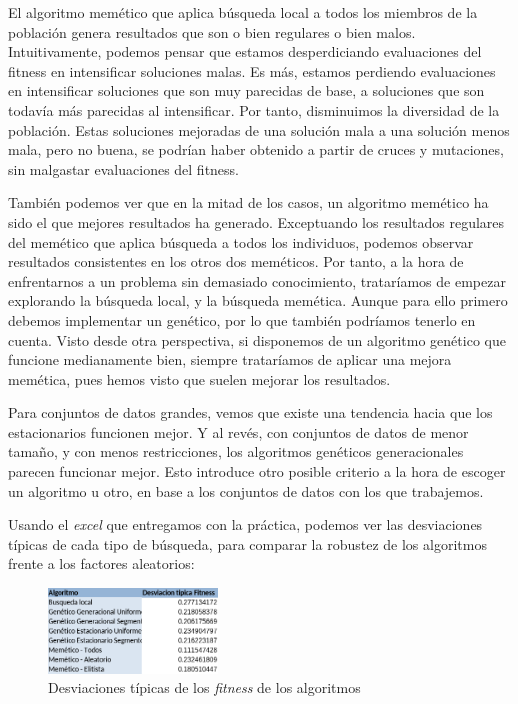 \documentclass[11pt]{article}
\begin{document}
El algoritmo memético que aplica búsqueda local a todos los miembros de la población genera resultados que son o bien regulares o bien malos. Intuitivamente, podemos pensar que estamos desperdiciando evaluaciones del fitness en intensificar soluciones malas. Es más, estamos perdiendo evaluaciones en intensificar soluciones que son muy parecidas de base, a soluciones que son todavía más parecidas al intensificar. Por tanto, disminuimos la diversidad de la población. Estas soluciones mejoradas de una solución mala a una solución menos mala, pero no buena, se podrían haber obtenido a partir de cruces y mutaciones, sin malgastar evaluaciones del fitness.

También podemos ver que en la mitad de los casos, un algoritmo memético ha sido el que mejores resultados ha generado. Exceptuando los resultados regulares del memético que aplica búsqueda a todos los individuos, podemos observar resultados consistentes en los otros dos meméticos. Por tanto, a la hora de enfrentarnos a un problema sin demasiado conocimiento, trataríamos de empezar explorando la búsqueda local, y la búsqueda memética. Aunque para ello primero debemos implementar un genético, por lo que también podríamos tenerlo en cuenta. Visto desde otra perspectiva, si disponemos de un algoritmo genético que funcione medianamente bien, siempre trataríamos de aplicar una mejora memética, pues hemos visto que suelen mejorar los resultados.

Para conjuntos de datos grandes, vemos que existe una tendencia hacia que los estacionarios funcionen mejor. Y al revés, con conjuntos de datos de menor tamaño, y con menos restricciones, los algoritmos genéticos generacionales parecen funcionar mejor. Esto introduce otro posible criterio a la hora de escoger un algoritmo u otro, en base a los conjuntos de datos con los que trabajemos.

Usando el \emph{excel} que entregamos con la práctica, podemos ver las desviaciones típicas de cada tipo de búsqueda, para comparar la robustez de los algoritmos frente a los factores aleatorios:

\begin{figure}[H]
    \centering
    \includegraphics[width=0.4\textwidth]{desviaciones_tipicas}
    \caption{Desviaciones típicas de los \emph{fitness} de los algoritmos}
\end{figure}
\end{document}
